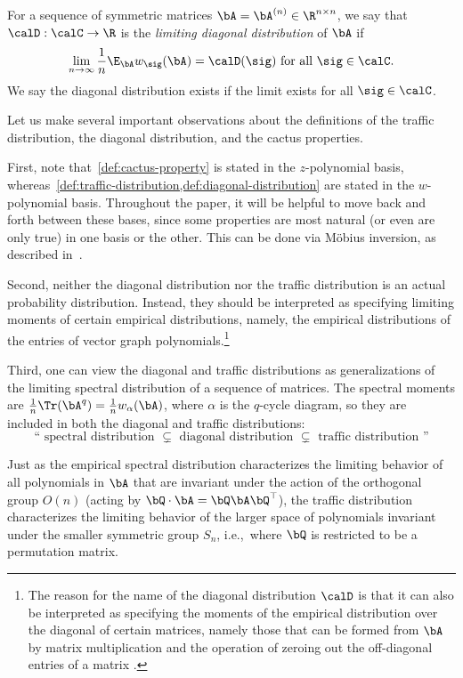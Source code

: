 \begin{definition}\label{def:diagonal-distribution}
    For a sequence of symmetric matrices $\bA = \bA^{(n)} \in \R^{n \times n}$, we say that
    $\calD: \calC \to \R$ is the \emph{limiting diagonal distribution} of $\bA$ if
    \[ \lim_{n \to \infty} \frac{1}{n}\E_\bA  w_{\sig}(\bA) = \calD(\sig) \text{ for all } \sig \in \calC. \]
    We say the diagonal distribution exists if the limit exists for all $\sig \in \calC$.
\end{definition}

Let us make several important observations about the definitions of the
traffic distribution, the diagonal distribution, and the cactus
properties.

First, note that~\cref{def:cactus-property} is stated in the $z$-polynomial basis, whereas~\cref{def:traffic-distribution,def:diagonal-distribution} are stated in the $w$-polynomial
basis.
Throughout the paper, it will be helpful to move back and forth
between these bases, since some properties are most natural (or even are
only true) in one basis or the other.
This can be done via M{\"o}bius inversion, as described
in~.

Second, neither the diagonal distribution nor the traffic
distribution is an actual probability distribution.
Instead, they should be interpreted as specifying limiting moments of
certain empirical distributions, namely, the empirical distributions
of the entries of vector graph polynomials.\footnote{
The reason for the name of the diagonal distribution $\calD$ is that it can also be interpreted as specifying the moments of the empirical distribution over the diagonal of certain matrices, namely those that can be formed from $\bA$ by matrix multiplication and the operation of zeroing out the off-diagonal entries of a matrix \cite{wang2022universality}.}

Third, one can view the diagonal and traffic distributions as
generalizations of the limiting spectral distribution of a sequence of matrices.
The spectral moments are $\frac1n \Tr(\bA^q)=\frac1n w_\alpha(\bA)$,
where $\alpha$ is the $q$-cycle diagram, so they are included in both
the diagonal and traffic distributions:
\[ \text{`` spectral distribution} \,\, \subsetneq \,\, \text{diagonal distribution} \,\, \subsetneq \,\, \text{traffic distribution ''} \]

Just as the empirical spectral distribution characterizes the
limiting behavior of all polynomials in $\bA$ that are invariant under
the action of the orthogonal group $O(n)$
(acting by $\bQ \cdot \bA = \bQ\bA\bQ^{\top}$), the traffic distribution characterizes the limiting behavior of the larger space of
polynomials invariant under the smaller symmetric group
$S_n$, i.e.,\ where $\bQ$ is restricted to be a permutation matrix.


